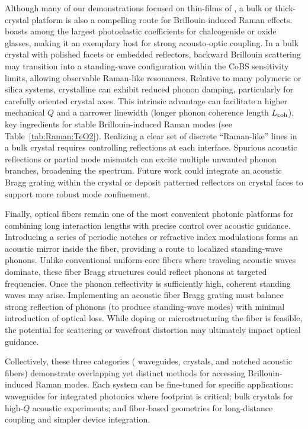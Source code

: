 Although many of our demonstrations focused on thin-films of , a bulk or thick-crystal platform is also a compelling route for Brillouin-induced Raman effects.  boasts among the largest photoelastic coefficients for chalcogenide or oxide glasses, making it an exemplary host for strong acousto-optic coupling. In a bulk crystal with polished facets or embedded reflectors, backward Brillouin scattering may transition into a standing-wave configuration within the \ac{CoBS} sensitivity limits, allowing observable Raman-like resonances. Relative to many polymeric or silica systems, crystalline  can exhibit reduced phonon damping, particularly for carefully oriented crystal axes. This intrinsic advantage can facilitate a higher mechanical \(Q\) and a narrower linewidth (longer phonon coherence length \(L_{\rm coh}\)), key ingredients for stable Brillouin-induced Raman modes (see Table~\ref{tab:Raman:TeO2}). Realizing a clear set of discrete ``Raman-like'' lines in a bulk crystal requires controlling reflections at each interface. Spurious acoustic reflections or partial mode mismatch can excite multiple unwanted phonon branches, broadening the spectrum. Future work could integrate an acoustic Bragg grating within the crystal or deposit patterned reflectors on crystal faces to support more robust mode confinement.

Finally, optical fibers remain one of the most convenient photonic platforms for combining long interaction lengths with precise control over acoustic guidance. Introducing a series of periodic notches or refractive index modulations forms an acoustic mirror inside the fiber, providing a route to localized standing-wave phonons. Unlike conventional uniform-core fibers where traveling acoustic waves dominate, these fiber Bragg structures could reflect phonons at targeted frequencies. Once the phonon reflectivity is sufficiently high, coherent standing waves may arise. Implementing an acoustic fiber Bragg grating must balance strong reflection of phonons (to produce standing-wave modes) with minimal introduction of optical loss. While doping or microstructuring the fiber is feasible, the potential for scattering or wavefront distortion may ultimately impact optical guidance.

Collectively, these three categories ( waveguides,  crystals, and notched acoustic fibers) demonstrate overlapping yet distinct methods for accessing Brillouin-induced Raman modes. Each system can be fine-tuned for specific applications:  waveguides for integrated photonics where footprint is critical; bulk crystals for high-\(Q\) acoustic experiments; and fiber-based geometries for long-distance coupling and simpler device integration.


